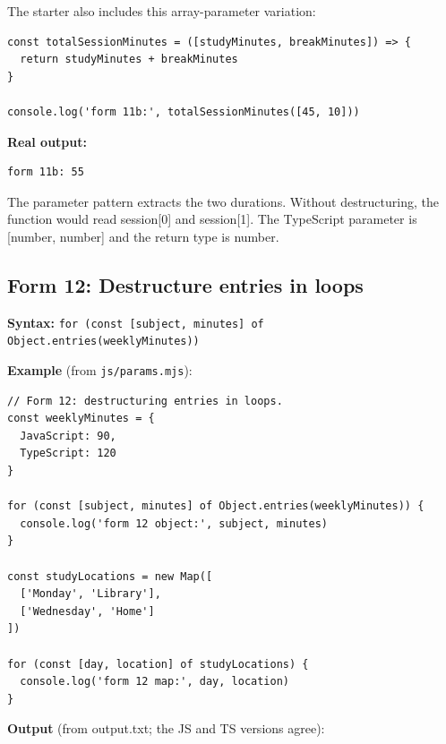 \documentclass[10pt,a4paper]{article}
\begin{document}

The starter also includes this array-parameter variation:

\begin{lstlisting}[language=GuideJS]
const totalSessionMinutes = ([studyMinutes, breakMinutes]) => {
  return studyMinutes + breakMinutes
}

console.log('form 11b:', totalSessionMinutes([45, 10]))
\end{lstlisting}


\textbf{Real output:}

\begin{lstlisting}[language={}]
form 11b: 55
\end{lstlisting}

The parameter pattern extracts the two durations. Without destructuring, the function would read session[0] and session[1]. The TypeScript parameter is [number, number] and the return type is number.

\subsection{Form 12: Destructure entries in loops}

\textbf{Syntax:} \texttt{for (const [subject,\allowbreak{} minutes] of Object.\allowbreak{}entries(weekly\allowbreak{}Minutes))}


\textbf{Example} (from \texttt{js/\allowbreak{}params.\allowbreak{}mjs}):

\begin{lstlisting}[language=GuideJS]
// Form 12: destructuring entries in loops.
const weeklyMinutes = {
  JavaScript: 90,
  TypeScript: 120
}

for (const [subject, minutes] of Object.entries(weeklyMinutes)) {
  console.log('form 12 object:', subject, minutes)
}

const studyLocations = new Map([
  ['Monday', 'Library'],
  ['Wednesday', 'Home']
])

for (const [day, location] of studyLocations) {
  console.log('form 12 map:', day, location)
}
\end{lstlisting}


\textbf{Output} (from output.txt; the JS and TS versions agree):
\end{document}
